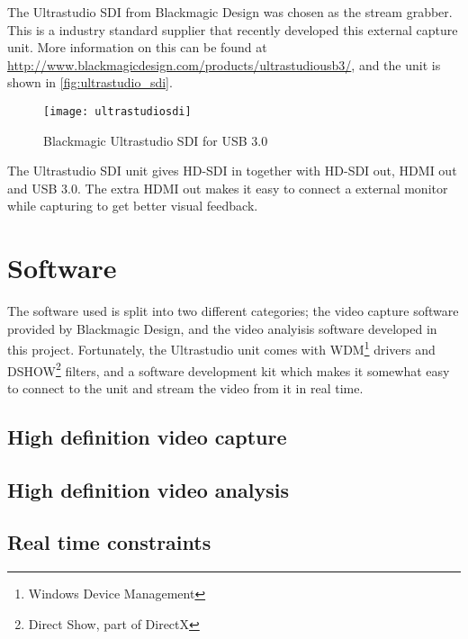 The Ultrastudio SDI from Blackmagic Design was chosen as the stream grabber. This is a industry standard 
supplier that recently developed this external capture unit. More information on this can be found at 
\url{http://www.blackmagicdesign.com/products/ultrastudiousb3/}, and the unit is shown in \vref{fig:ultrastudio_sdi}.

\begin{figure}[htbp]
	\centering
	\texttt{[image: ultrastudiosdi]}
	\caption{Blackmagic Ultrastudio SDI for USB 3.0}
	\label{fig:ultrastudio_sdi}
\end{figure}

The Ultrastudio SDI unit gives HD-SDI in together with HD-SDI out, HDMI out and USB 3.0. The 
extra HDMI out makes it easy to connect a external monitor while capturing to get better visual feedback.



\section{Software}
The software used is split into two different categories; the video capture software provided by Blackmagic 
Design, and the video analyisis software developed in this project. Fortunately, the Ultrastudio 
unit comes with WDM\footnote{Windows Device Management} drivers and DSHOW\footnote{Direct Show, part of DirectX} 
filters, and a software development kit which makes it somewhat easy to connect to the unit and stream 
the video from it in real time. 


\subsection{High definition video capture}

\subsection{High definition video analysis}

\subsection{Real time constraints}

